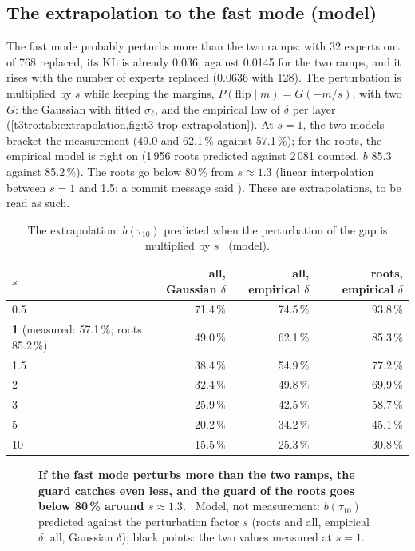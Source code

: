 \subsection{The extrapolation to the fast mode (model)}\label{t3tro:sec:extrapolation}

The fast mode probably perturbs more than the two ramps: with 32 experts out of 768 replaced, its KL is already 0.036, against 0.0145 for the two ramps, and it rises with the number of experts replaced (0.0636 with 128). The perturbation is multiplied by $s$ while keeping the margins, $P(\text{flip} \mid m) = G(-m/s)$, with two $G$: the Gaussian with fitted $\sigma_\ell$, and the empirical law of $\delta$ per layer (\cref{t3tro:tab:extrapolation,fig:t3-trop-extrapolation}). At $s = 1$, the two models bracket the measurement (49.0 and 62.1\,\% against 57.1\,\%); for the roots, the empirical model is right on (1\,956 roots predicted against 2\,081 counted, $b$ 85.3 against 85.2\,\%). The roots go below 80\,\% from $s \approx 1.3$ (linear interpolation between $s = 1$ and 1.5; a commit message said ). These are extrapolations, to be read as such.

\begin{table}[tbp]
\centering\small
\caption[The extrapolation of the guard]{The extrapolation: $b(\tau_{10})$ predicted when the perturbation of the gap is multiplied by $s$ \calc~(model).}
\label{t3tro:tab:extrapolation}
\begin{tabular}{@{}lrrr@{}}
\toprule
$s$ & all, Gaussian $\delta$ & all, empirical $\delta$ & roots, empirical $\delta$ \\
\midrule
0.5 & 71.4\,\% & 74.5\,\% & 93.8\,\% \\
\textbf{1} (measured: 57.1\,\%; roots 85.2\,\%) & 49.0\,\% & 62.1\,\% & 85.3\,\% \\
1.5 & 38.4\,\% & 54.9\,\% & 77.2\,\% \\
2 & 32.4\,\% & 49.8\,\% & 69.9\,\% \\
3 & 25.9\,\% & 42.5\,\% & 58.7\,\% \\
5 & 20.2\,\% & 34.2\,\% & 45.1\,\% \\
10 & 15.5\,\% & 25.3\,\% & 30.8\,\% \\
\bottomrule
\end{tabular}
\end{table}

\begin{figure}[tbp]
\centering
\GrapheTropicaleExtrapolation
\caption[The extrapolation of the guard (model)]{\textbf{If the fast mode perturbs more than the two ramps, the guard catches even less, and the guard of the roots goes below 80\,\% around $s \approx 1.3$.} \calc~Model, not measurement: $b(\tau_{10})$ predicted against the perturbation factor $s$ (roots and all, empirical $\delta$; all, Gaussian $\delta$); black points: the two values measured at $s = 1$. }
\label{fig:t3-trop-extrapolation}
\end{figure}

